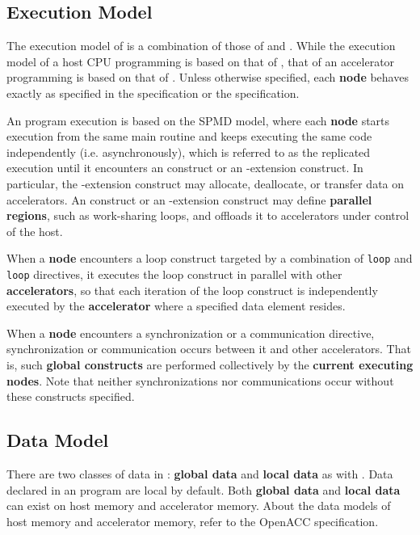 \subsection{Execution Model}
The execution model of {\XACC} is a combination of those of {\XMP} and {\OACC}.
While the execution model of a host CPU programming is based on that of {\XMP},
that of an accelerator programming is based on that of {\OACC}.
Unless otherwise specified,
each {\bf node} behaves exactly as specified in the {\XMP} specification\cite{xmp} or the {\OACC} specification\cite{openacc}.

An {\XACC} program execution is based on the SPMD model, 
where each {\bf node} starts execution from the same main routine and keeps executing the same code independently (i.e. asynchronously), 
which is referred to as the replicated execution
until it encounters an {\XMP} construct or an {\XMP}-extension construct.
In particular,
the {\XMP}-extension construct may allocate, deallocate, or transfer data on accelerators.
An {\OACC} construct or an {\OACC}-extension construct may define {\bf parallel regions}, such as work-sharing loops, 
and offloads it to accelerators under control of the host.

When a {\bf node} encounters a loop construct 
targeted by a combination of {\XMP} {\tt loop} and {\OACC} {\tt loop} directives,
it executes the loop construct in parallel with other {\bf accelerators},
so that each iteration of the loop construct is independently executed by the {\bf accelerator}
where a specified data element resides.

When a {\bf node} encounters a {\XACC} synchronization or a {\XACC} communication directive,
synchronization or communication occurs between it and other accelerators.
That is, such {\bf global constructs} are performed collectively by the {\bf current executing nodes}.
Note that neither synchronizations nor communications occur without these constructs specified.

\subsection{Data Model}
There are two classes of data in {\XACC}: {\bf global data} and {\bf local data} as with {\XMP}. 
Data declared in an {\XACC} program are local by default.
Both {\bf global data} and {\bf local data} can exist on host memory and accelerator memory.
About the data models of host memory and accelerator memory, refer to the OpenACC specification\cite{openacc}.

